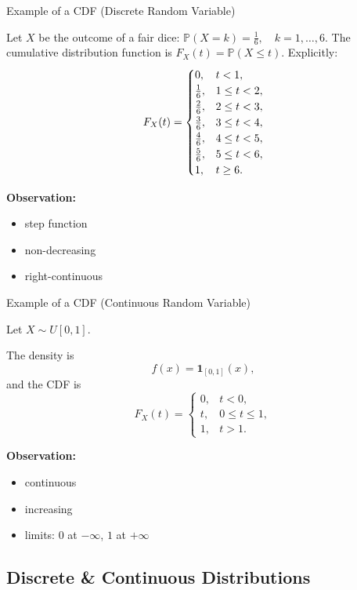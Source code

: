\documentclass[aspectratio=169]{beamer}
\begin{document}
\begin{frame}{Example of a CDF (Discrete Random Variable)}

Let \(X\) be the outcome of a fair dice:
$
\mathbb{P}(X=k)=\frac{1}{6},\quad k=1,\dots,6.
$
The cumulative distribution function is
$
F_X(t)=\mathbb{P}(X\le t).
$\pause
Explicitly:
\[
F_X(t)=
\begin{cases}
0, & t<1,\\
\frac{1}{6}, & 1\le t<2,\\
\frac{2}{6}, & 2\le t<3,\\
\frac{3}{6}, & 3\le t<4,\\
\frac{4}{6}, & 4\le t<5,\\
\frac{5}{6}, & 5\le t<6,\\
1, & t\ge6.
\end{cases}
\vspace{-9mm}
\]

\textbf{Observation:}
\begin{itemize}
  \item step function
  \item non-decreasing
  \item right-continuous
\end{itemize}

\end{frame}

\begin{frame}{Example of a CDF (Continuous Random Variable)}

Let \(X\sim U[0,1]\).

The density is
\[
f(x)=\mathbf{1}_{[0,1]}(x),
\]\pause
and the CDF is
\[
F_X(t)=
\begin{cases}
0, & t<0,\\
t, & 0\le t\le1,\\
1, & t>1.
\end{cases}
\]\pause

\medskip

\textbf{Observation:}
\begin{itemize}
  \item continuous
  \item increasing
  \item limits: \(0\) at \(-\infty\), \(1\) at \(+\infty\)
\end{itemize}

\end{frame}


\subsection{Discrete \& Continuous Distributions}
\end{document}
